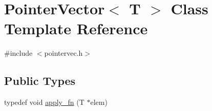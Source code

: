 \hypertarget{classPointerVector}{\section{Pointer\-Vector$<$ T $>$ Class Template Reference}
\label{classPointerVector}
}


{\ttfamily \#include $<$pointervec.\-h$>$}

\subsection*{Public Types}
\begin{DoxyCompactItemize}
\item 
typedef void \hyperlink{classPointerVector_a578da527d71168684229a721b16e823f}{apply\-\_\-fn} (T $\ast$elem)
\end{DoxyCompactItemize}
